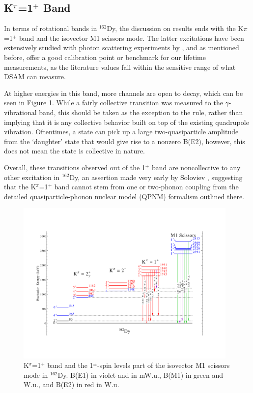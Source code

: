 \subsection{K$^\pi$=1$^+$ Band}
In terms of rotational bands in $^{162}$Dy, the discussion on results ends with the K$\pi$=1$^+$ band and the isovector M1 scissors mode. The latter excitations have been extensively studied with photon scattering experiments by \cite{Margraf_gg'NRF_1995,Yates_162nnp1995}, and as mentioned before, offer a good calibration point or benchmark for our lifetime measurements, as the literature values fall within the sensitive range of what DSAM can measure. 


At higher energies in this band, more channels are open to decay, which can be seen in Figure \ref{fig:162Dy_scissors}. While a fairly collective transition was measured to the $\gamma$-vibrational band, this should be taken as the exception to the rule, rather than implying that it is any collective behavior built on top of the existing quadrupole vibration. Oftentimes, a state can pick up a large two-quasiparticle amplitude from the `daughter' state that would give rise to a nonzero B(E2), however, this does not mean the state is collective in nature.

Overall, these transitions observed out of the 1$^+$ band are noncollective to any other excitation in $^{162}$Dy, an assertion made very early by Soloviev \cite{Solovev_162K2octupole}, suggesting that the K$^\pi$=1$^+$ band cannot stem from one or two-phonon coupling from the detailed quasiparticle-phonon nuclear model (QPNM) formalism outlined there.  

\begin{figure}[h!]
\begin{center}
\includegraphics[width=0.97\textwidth]{162Dy_scissors.pdf}
\end{center}
\caption{K$^\pi$=1$^+$ band and the 1$^\pm$-spin levels part of the isovector M1 scissors mode in $^{162}$Dy. B(E1) in violet and in mW.u., B(M1) in green and W.u., and B(E2) in red in W.u. \label{fig:162Dy_scissors}}
\end{figure}
